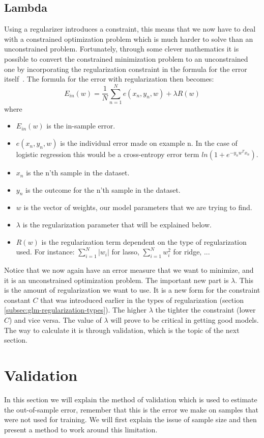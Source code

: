 \subsection{Lambda}
\label{subsec:glm-lambda}
Using a regularizer introduces a constraint, this means that we now have to deal with a constrained optimization problem which is much harder to solve than an unconstrained problem. Fortunately, through some clever mathematics it is possible to convert the constrained minimization problem to an unconstrained one by incorporating the regularization constraint in the formula for the error itself~\cite{caltechmachinelearning}. The formula for the error with regularization then becomes:
$$
E_{in}(w) = \frac{1}{N}\sum_{n=1}^{N}e(x_{n},y_{n},w)+\lambda R(w)
$$
where
\begin{itemize}
	\item $E_{in}(w)$ is the in-sample error.
	\item $e(x_{n},y_{n},w)$ is the individual error made on example n. In the case of logistic regression this would be a cross-entropy error term $ln(1+e^{-y_{n}w^{T}x_{n}})$.
	\item $x_{n}$ is the n'th sample in the dataset.
	\item $y_{n}$ is the outcome for the n'th sample in the dataset.
	\item $w$ is the vector of weights, our model parameters that we are trying to find.
	\item $\lambda$ is the regularization parameter that will be explained below.
	\item $R(w)$ is the regularization term dependent on the type of regularization used. For instance: $\sum_{i=1}^{N}\lvert w_{i}\rvert$ for lasso, $\sum_{i=1}^{N}w_{i}^{2}$ for ridge, ...
\end{itemize}
Notice that we now again have an error measure that we want to minimize, and it is an unconstrained optimization problem. The important new part is $\lambda$. This is the amount of regularization we want to use. It is a new form for the constraint constant $C$ that was introduced earlier in the types of regularization (section \ref{subsec:glm-regularization-types}). The higher $\lambda$ the tighter the constraint (lower $C$) and vice versa. The value of $\lambda$ will prove to be critical in getting good models. The way to calculate it is through validation, which is the topic of the next section.
\section{Validation}
\label{sec:glm-validation}
In this section we will explain the method of validation which is used to estimate the out-of-sample error, remember that this is the error we make on samples that were not used for training. We will first explain the issue of sample size and then present a method to work around this limitation.

